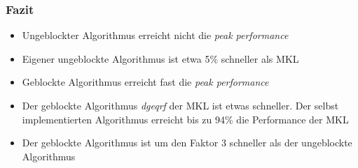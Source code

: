 \begin{frame}
\frametitle{Fazit}
\begin{itemize}
	\item Ungeblockter Algorithmus erreicht nicht die \textit{peak performance}
	\item Eigener ungeblockte Algorithmus ist etwa 5\% schneller als MKL
	\item Geblockte Algorithmus erreicht fast die \textit{peak performance}
	\item Der geblockte Algorithmus \textit{dgeqrf} der MKL ist etwas schneller. Der selbst implementierten Algorithmus erreicht bis zu 94\% die Performance der MKL
	\item Der geblockte Algorithmus ist um den Faktor 3 schneller als der ungeblockte Algorithmus
\end{itemize}
\end{frame}




